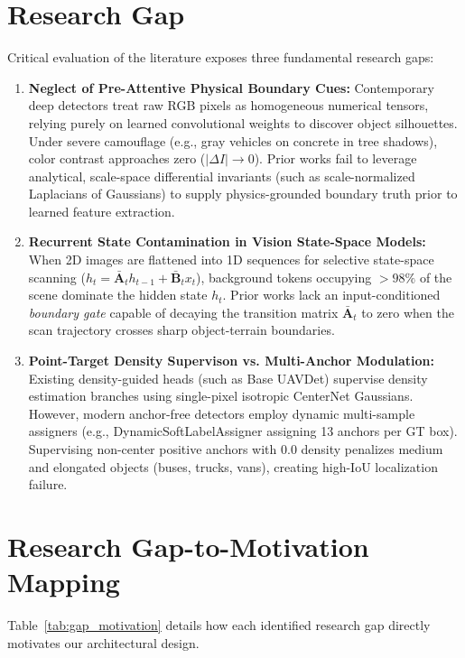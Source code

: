 \documentclass[12pt,a4paper]{report}
\begin{document}
\section{Research Gap}
Critical evaluation of the literature exposes three fundamental research gaps:
\begin{enumerate}[leftmargin=2em]
    \item \textbf{Neglect of Pre-Attentive Physical Boundary Cues:} Contemporary deep detectors treat raw RGB pixels as homogeneous numerical tensors, relying purely on learned convolutional weights to discover object silhouettes. Under severe camouflage (e.g., gray vehicles on concrete in tree shadows), color contrast approaches zero ($|\Delta I| \to 0$). Prior works fail to leverage analytical, scale-space differential invariants (such as scale-normalized Laplacians of Gaussians) to supply physics-grounded boundary truth prior to learned feature extraction.
    \item \textbf{Recurrent State Contamination in Vision State-Space Models:} When 2D images are flattened into 1D sequences for selective state-space scanning ($h_t = \mathbf{\bar{A}}_t h_{t-1} + \mathbf{\bar{B}}_t x_t$), background tokens occupying $>98\%$ of the scene dominate the hidden state $h_t$. Prior works lack an input-conditioned \textit{boundary gate} capable of decaying the transition matrix $\mathbf{\bar{A}}_t$ to zero when the scan trajectory crosses sharp object-terrain boundaries.
    \item \textbf{Point-Target Density Supervison vs. Multi-Anchor Modulation:} Existing density-guided heads (such as Base UAVDet) supervise density estimation branches using single-pixel isotropic CenterNet Gaussians. However, modern anchor-free detectors employ dynamic multi-sample assigners (e.g., DynamicSoftLabelAssigner assigning 13 anchors per GT box). Supervising non-center positive anchors with 0.0 density penalizes medium and elongated objects (buses, trucks, vans), creating high-IoU localization failure.
\end{enumerate}

\section{Research Gap-to-Motivation Mapping}
Table~\ref{tab:gap_motivation} details how each identified research gap directly motivates our architectural design.
\end{document}
